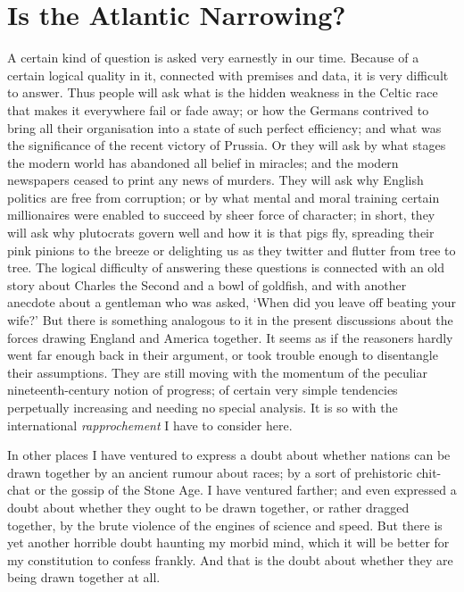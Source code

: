 \documentclass{book}
\begin{document}
\chapter{Is the Atlantic Narrowing?}
\label{chapter-12}
A certain kind of question is asked very earnestly in our time. Because of a certain logical quality in it, connected with premises and data, it is very difficult to answer. Thus people will ask what is the hidden weakness in the Celtic race that makes it everywhere fail or fade away; or how the Germans contrived to bring all their organisation into a state of such perfect efficiency; and what was the significance of the recent victory of Prussia. Or they will ask by what stages the modern world has abandoned all belief in miracles; and the modern newspapers ceased to print any news of murders. They will ask why English politics are free from corruption; or by what mental and moral training certain millionaires were enabled to succeed by sheer force of character; in short, they will ask why plutocrats govern well and how it is that pigs fly, spreading their pink pinions to the breeze or delighting us as they twitter and flutter from tree to tree. The logical difficulty of answering these questions is connected with an old story about Charles the Second and a bowl of goldfish, and with another anecdote about a gentleman who was asked, ‘When did you leave off beating your wife?’ But there is something analogous to it in the present discussions about the forces drawing England and America together. It seems as if the reasoners hardly went far enough back in their argument, or took trouble enough to disentangle their assumptions. They are still moving with the momentum of the peculiar nineteenth-century notion of progress; of certain very simple tendencies perpetually increasing and needing no special analysis. It is so with the international \emph{rapprochement} I have to consider here.

In other places I have ventured to express a doubt about whether nations can be drawn together by an ancient rumour about races; by a sort of prehistoric chit-chat or the gossip of the Stone Age. I have ventured farther; and even expressed a doubt about whether they ought to be drawn together, or rather dragged together, by the brute violence of the engines of science and speed. But there is yet another horrible doubt haunting my morbid mind, which it will be better for my constitution to confess frankly. And that is the doubt about whether they are being drawn together at all.
\end{document}
